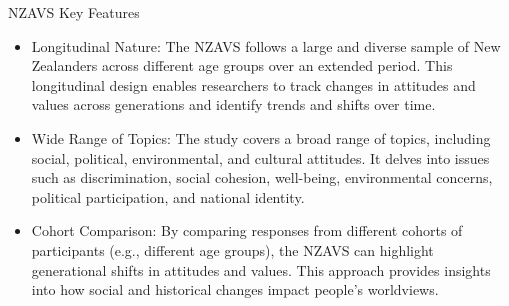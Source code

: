 \documentclass[
  ignorenonframetext,
  aspectratio=169,
]{beamer}
\providecommand{\tightlist}{%
  \setlength{\itemsep}{0pt}\setlength{\parskip}{0pt}}\usepackage{longtable,booktabs,array}
\begin{document}
\begin{frame}{NZAVS Key Features}
\label{nzavs-key-features}
\begin{itemize}[<+->]
\tightlist
\item
  Longitudinal Nature: The NZAVS follows a large and diverse sample of
  New Zealanders across different age groups over an extended period.
  This longitudinal design enables researchers to track changes in
  attitudes and values across generations and identify trends and shifts
  over time.
\item
  Wide Range of Topics: The study covers a broad range of topics,
  including social, political, environmental, and cultural attitudes. It
  delves into issues such as discrimination, social cohesion,
  well-being, environmental concerns, political participation, and
  national identity.
\item
  Cohort Comparison: By comparing responses from different cohorts of
  participants (e.g., different age groups), the NZAVS can highlight
  generational shifts in attitudes and values. This approach provides
  insights into how social and historical changes impact people's
  worldviews.
\end{itemize}


\end{frame}
\end{document}
